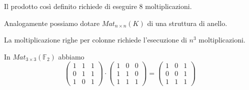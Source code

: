 \documentclass[../main.tex]{subfiles}
\begin{document}
Il prodotto così definito richiede di eseguire 8 moltiplicazioni.

Analogamente possiamo dotare $Mat_{n \times n}(K)$ di una struttura di anello.

La moltiplicazione righe per colonne richiede l'esecuzione di $n^3$ moltiplicazioni.

\begin{example}
    In $Mat_{3 \times 3}(\mathbb{F}_2)$ abbiamo
    \begin{equation*}
        \begin{pmatrix}
            1 & 1 & 1 \\
            0 & 1 & 1 \\
            1 & 0 & 1
        \end{pmatrix}
        \cdot
        \begin{pmatrix}
            1 & 0 & 0 \\
            1 & 1 & 0 \\
            1 & 1 & 1
        \end{pmatrix}
        =
        \begin{pmatrix}
            1 & 0 & 1 \\
            0 & 0 & 1 \\
            1 & 1 & 1
        \end{pmatrix}
    \end{equation*}
\end{example}
\end{document}
